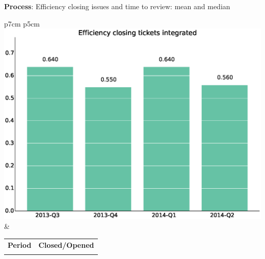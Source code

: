 \documentclass[a4wide,11pt]{report}
\begin{document}
\textbf{Process}: Efficiency closing issues and time to review: mean and median

\begin{tabular}{p{7cm} p{5cm}}
    \vspace{0pt} 
    \includegraphics[scale=.35]{figs/bmiintegrated.eps}
    & 
    \vspace{0pt}
    \begin{tabular}{l|l}%
    \bfseries Period & \bfseries Closed/Opened %
    \csvreader[head to column names]{data/bmiintegrated.csv}{}%
    {\\ & \bmi}
    \end{tabular}
\end{tabular}
\end{document}
